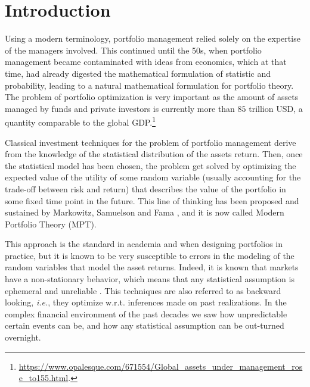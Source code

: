 \chapter{Introduction}

Using a modern terminology, portfolio management relied solely on the expertise of the managers involved. This continued until the 50s, when portfolio management became contaminated with ideas from economics, which at that time, had already digested the mathematical formulation of statistic and probability, leading to a natural mathematical formulation for portfolio theory.
The problem of portfolio optimization is very important as the amount of assets managed by funds and private investors is currently more than $85$ trillion USD, a quantity comparable to the global GDP.\footnote{\url{https://www.opalesque.com/671554/Global_assets_under_management_rose_to155.html}.}

Classical investment techniques for the problem of portfolio management derive from the knowledge of the statistical distribution of the assets return. Then, once the statistical model has been chosen, the problem get solved by optimizing the expected value of the utility of some random variable (usually accounting for the trade-off between risk and return) that describes the value of the portfolio in some fixed time point in the future. This line of thinking has been proposed and sustained by Markowitz, Samuelson and Fama \cite{markowitz1952portfolio}, and it is now called Modern Portfolio Theory (MPT). 

This approach is the standard in academia and when designing portfolios in practice, but it is known to be very susceptible to errors in the modeling of the random variables that model the asset returns. 
Indeed, it is known that markets have a non-stationary behavior, which means that any statistical assumption is ephemeral and unreliable \cite{schmitt2013non}. This techniques are also referred to as backward looking, \emph{i.e.}, they optimize w.r.t. inferences made on past realizations. In the complex financial environment of the past decades we saw how unpredictable certain events can be, and how any statistical assumption can be out-turned overnight.

